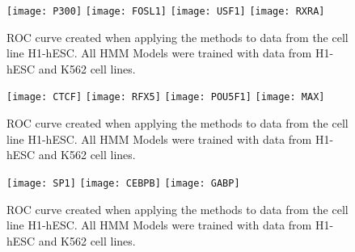 \documentclass[11pt,a4]{article}
\begin{document}
\begin{figure}[h]
\centering
    \texttt{[image: P300]}
    \texttt{[image: FOSL1]}
    \texttt{[image: USF1]}
    \texttt{[image: RXRA]}
\caption{ROC curve created when applying the methods to data from the cell line H1-hESC. All HMM Models were trained with data from H1-hESC and K562 cell lines.}
\label{fig:roc.H1hesc.fdr_4.6}
\end{figure}

\begin{figure}[h]
\centering
    \texttt{[image: CTCF]}
    \texttt{[image: RFX5]}
    \texttt{[image: POU5F1]}
    \texttt{[image: MAX]}
\caption{ROC curve created when applying the methods to data from the cell line H1-hESC. All HMM Models were trained with data from H1-hESC and K562 cell lines.}
\label{fig:roc.H1hesc.fdr_4.7}
\end{figure}

\begin{figure}[h]
\centering
    \texttt{[image: SP1]}
    \texttt{[image: CEBPB]}
    \texttt{[image: GABP]}
\caption{ROC curve created when applying the methods to data from the cell line H1-hESC. All HMM Models were trained with data from H1-hESC and K562 cell lines.}
\label{fig:roc.H1hesc.fdr_4.8}
\end{figure}
\end{document}
